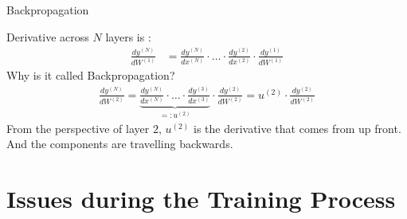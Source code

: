 \documentclass[aspectratio=169]{beamer}
\begin{document}
\begin{frame}{Backpropagation}

Derivative across $N$ layers is :
\begin{align}
\frac{d y^{(N)}} { d W^{(1)}} &= \frac{ d y^{(N)}} {d x^{(N )}} \cdot \ldots \cdot \frac{ d y^{(2)}} {d x^{(2)}} \cdot \frac{d y^{(1)}} {d W^{(1)}}
\end{align}
 Why is it called Backpropagation?
\begin{align}
\frac{d y^{(N)}} { d W^{(2)}} = \underbrace{\frac{ d y^{(N)}} {d x^{(N )}} \cdot \ldots \cdot \frac{ d y^{(3)}} {d x^{(3)}}}_{ =: u^{(2)}}
\cdot \frac{d y^{(2)}} {d W^{(2)}}
= u^{(2)} \cdot \frac{d y^{(2)}} {d W^{(2)}}
\end{align}
From the perspective of layer $2$,  $u^{(2)} $ is the derivative that comes from up front. And the components are travelling backwards.
\end{frame}

\section{Issues during the Training Process}
\end{document}

